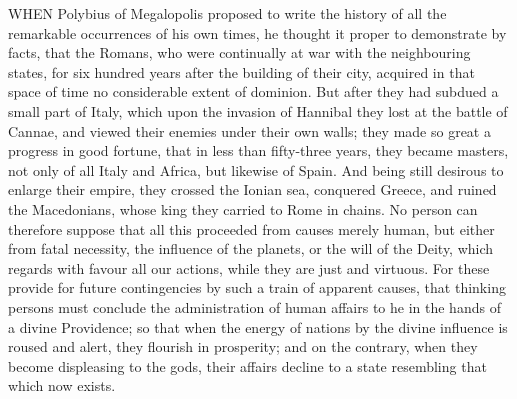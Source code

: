 
WHEN Polybius of Megalopolis proposed to write the history of all the remarkable occurrences of his own times, he thought it proper to demonstrate by facts, that the Romans, who were continually at war with the neighbouring states, for six hundred years after the building of their city, acquired
in that space of time no considerable extent of dominion. But after they had subdued a small part of Italy, which upon the invasion of Hannibal they lost at the battle of Cannae, and viewed their enemies under their own walls; they made so great a progress in good fortune, that in less than fifty-three years, they became masters, not only of all Italy and Africa, but likewise of Spain. And being still desirous to enlarge their empire, they crossed the Ionian sea, conquered Greece, and ruined the Macedonians, whose king they carried to Rome in chains. No person can therefore suppose that all this proceeded from causes merely human, but either from fatal necessity, the influence of the planets, or the will of the Deity, which regards with favour all our actions, while they are just and virtuous. For these provide for future contingencies by such a train of apparent causes, that thinking persons must conclude the administration of human affairs to he in the hands of a divine Providence; so that when the energy of nations by the divine influence is roused and alert, they flourish in prosperity; and on the contrary, when they become displeasing to the gods, their affairs decline to a state resembling that which now exists.

